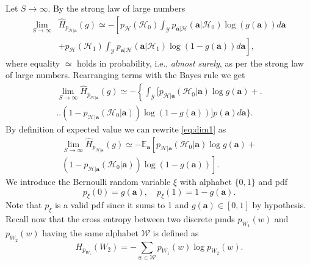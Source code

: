 \documentclass[conference,final]{IEEEtran}
\newcommand{\cross}[2]{H_{#1}(#2)}
\newcommand{\hatcross}[2]{\hat{H}_{#1}(#2)}
\newcommand{\gy}{g(\bm a)}
\begin{document}
\begin{appendices}
Let $S \to \infty$. By the strong law of large numbers%
\begin{equation}
\label{eq:as}
\begin{split}
	\lim_{S \to \infty}&	\hatcross{ p_{\mathcal{H}|\bm a}}{g} \simeq - \left[ p_{\mathcal H}(\mathcal{H}_0) \int_{\mathcal{Y}} p_{\bm a|\mathcal{H}}(\bm a|\mathcal{H}_0) \log (\gy) d\bm a \right. \\
	& \left. + p_{\mathcal{H}}(\mathcal{H}_1) \int_{\mathcal{Y}} p_{\bm a|\mathcal{H}}(\bm a|\mathcal{H}_1) \log (1-\gy) d\bm a \right],
\end{split}
\end{equation}
where equality $\simeq$ holds in probability, i.e., \textit{almost surely}, as per the strong law of large numbers.
Rearranging terms with the Bayes rule we get
\begin{equation}
\label{eq:dim1}
\begin{split}
\lim_{S \to \infty}	\hatcross{p_{\mathcal{H}|\bm a}}{g} \simeq - \left\{ \int_{\mathcal{Y}} \bigl[ p_{\mathcal{H}|\bm a}(\mathcal{H}_0|\bm a) \log \gy + \right. \bigr.\\ 
	\bigl. \bigl.(1-p_{\mathcal{H}|\bm a}(\mathcal{H}_0|\bm a)) \log(1-\gy)\bigr] p(\bm a)   d\bm a \biggr\}. 		
\end{split}
\end{equation}
By definition of expected value we can rewrite \eqref{eq:dim1} as
\begin{equation}
		\label{eq:dim2}
		\begin{split}
	\lim_{S \to \infty}	\hatcross{p_{\mathcal{H}|\bm a}}{g} \simeq - \mathbb{E}_{\bm a} \left[ p_{\mathcal{H}|\bm a}(\mathcal{H}_0|\bm a) \log \gy + \right.\\ 
			\left. (1-p_{\mathcal{H}|\bm a}(\mathcal{H}_0|\bm a)) \log(1-\gy)\right].  		
		\end{split}
\end{equation}
We introduce the Bernoulli random variable $\xi$ with alphabet $ \{0,1\}$ and \ac{pdf} 
\begin{equation}
\label{eq:q}
p_\xi(0) = \gy, \quad
p_\xi(1) = 1- \gy.
\end{equation}
Note that $p_\xi$ is a valid \ac{pdf} since it sums to 1 and $\gy \in [0,1]$ by hypothesis.
Recall now that the cross entropy between two discrete \acp{pmd} $p_{W_1}(w)$ and $p_{W_2}(w)$ having the same alphabet $\mathcal{W}$ is defined as
\begin{equation}
\label{eq:defCross}
	\cross{p_{W_1}}{W_2} = - \sum_{w \in \mathcal{W}} p_{W_1}(w) \log p_{W_2}(w).

\end{equation}
\end{appendices}
\end{document}

